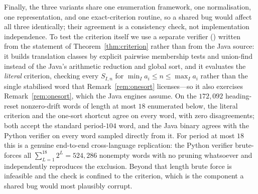 \documentclass[11pt,letterpaper]{article}
\theoremstyle{plain}
\theoremstyle{definition}
\begin{document}
\begin{NoHyper}
Finally, the three variants share one enumeration framework, one normalisation, one
representation, and one exact-criterion routine, so a shared bug would affect all
three identically; their agreement is a consistency check, not implementation
independence. To test the criterion itself we use a separate verifier
() written from the statement of
Theorem~\ref{thm:criterion} rather than from the Java source: it builds translation
classes by explicit pairwise membership tests and union-find instead of the Java's
arithmetic reduction and global sort, and it evaluates the \emph{literal} criterion,
checking every $S_{I,n}$ for $\min_I a_i\le n\le\max_I a_i$ rather than the single
stabilised word that Remark~\ref{rem:onesort} licenses---so it also exercises
Remark~\ref{rem:onesort}, which the Java engines assume. On the $172{,}092$
heading-reset nonzero-drift words of length at most $18$ enumerated below, the literal
criterion and the one-sort shortcut agree on every word, with zero disagreements; both
accept the standard period-$104$ word, and the Java binary agrees with the Python
verifier on every word sampled directly from it. For period at most $18$ this is a
genuine end-to-end cross-language replication: the Python verifier brute-forces all
$\sum_{L=1}^{18}2^L=524{,}286$ nonempty words with no pruning whatsoever and
independently reproduces the exclusion.
Beyond that length brute force is infeasible and the check is confined to the
criterion, which is the component a shared bug would most plausibly corrupt.


\end{NoHyper}
\end{document}
